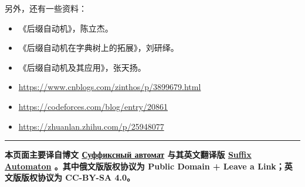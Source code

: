 另外，还有一些资料：

\begin{itemize}
\item
  《后缀自动机》，陈立杰。
\item
  《后缀自动机在字典树上的拓展》，刘研绎。
\item
  《后缀自动机及其应用》，张天扬。
\item
  \url{https://www.cnblogs.com/zinthos/p/3899679.html}
\item
  \url{https://codeforces.com/blog/entry/20861}
\item
  \url{https://zhuanlan.zhihu.com/p/25948077}
\end{itemize}

\begin{center}\rule{0.5\linewidth}{\linethickness}\end{center}

\textbf{本页面主要译自博文
\href{http://e-maxx.ru/algo/suffix_automata}{Суффиксный автомат}
与其英文翻译版
\href{https://cp-algorithms.com/string/suffix-automaton.html}{Suffix
Automaton} 。其中俄文版版权协议为 Public Domain + Leave a
Link；英文版版权协议为 CC-BY-SA 4.0。}
